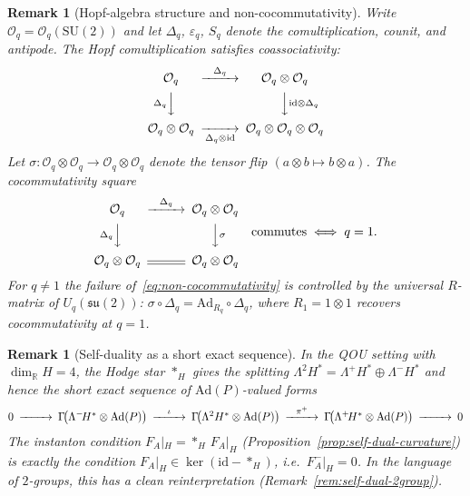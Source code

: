 \documentclass[12pt,a4paper]{report}
\newtheorem{remark}[theorem]{Remark}
\begin{document}
\begin{remark}[Hopf-algebra structure and non-cocommutativity]
\label{rem:hopf-structure-diagrams}
Write $\mathcal{O}_q = \mathcal{O}_q(\mathrm{SU}(2))$ and let
$\Delta_q$, $\varepsilon_q$, $S_q$ denote the comultiplication,
counit, and antipode.  The Hopf comultiplication satisfies
\emph{coassociativity}:
\begin{equation}\label{eq:coassociativity}
\begin{CD}
\mathcal{O}_q @>{\Delta_q}>>
  \mathcal{O}_q \otimes \mathcal{O}_q \\
@V{\Delta_q}VV
  @VV{\mathrm{id} \otimes \Delta_q}V \\
\mathcal{O}_q \otimes \mathcal{O}_q
  @>>{\Delta_q \otimes \mathrm{id}}>
  \mathcal{O}_q \otimes \mathcal{O}_q \otimes \mathcal{O}_q
\end{CD}
\end{equation}
Let $\sigma \colon \mathcal{O}_q \otimes \mathcal{O}_q \to
\mathcal{O}_q \otimes \mathcal{O}_q$ denote the tensor flip
$(a \otimes b \mapsto b \otimes a)$.  The cocommutativity square
\begin{equation}\label{eq:non-cocommutativity}
\begin{CD}
\mathcal{O}_q @>{\Delta_q}>>
  \mathcal{O}_q \otimes \mathcal{O}_q \\
@V{\Delta_q}VV  @VV{\sigma}V \\
\mathcal{O}_q \otimes \mathcal{O}_q
  @=
  \mathcal{O}_q \otimes \mathcal{O}_q
\end{CD}
\quad\text{commutes}\;\Longleftrightarrow\;q = 1.
\end{equation}
For $q \neq 1$ the failure of~\eqref{eq:non-cocommutativity} is
controlled by the universal $R$-matrix of $U_q(\mathfrak{su}(2))$:
$\sigma \circ \Delta_q = \mathrm{Ad}_{R_q} \circ \Delta_q$,
where $R_1 = 1 \otimes 1$ recovers cocommutativity at $q = 1$.
\end{remark}

\begin{remark}[Self-duality as a short exact sequence]
\label{rem:self-dual-ses}
In the QOU setting with $\dim_{\mathbb{R}} H = 4$, the Hodge star
$*_H$ gives the splitting
$\Lambda^2 H^* = \Lambda^+\!H^* \oplus \Lambda^-\!H^*$ and hence
the short exact sequence of $\mathrm{Ad}(P)$-valued forms
\begin{equation}\label{eq:self-dual-ses}
\begin{CD}
0 @>>>
  \Gamma\!\bigl(\Lambda^-\!H^* \otimes \mathrm{Ad}(P)\bigr)
  @>{\iota}>>
  \Gamma\!\bigl(\Lambda^2 H^* \otimes \mathrm{Ad}(P)\bigr)
  @>{\pi^+}>>
  \Gamma\!\bigl(\Lambda^+\!H^* \otimes \mathrm{Ad}(P)\bigr)
  @>>> 0
\end{CD}
\end{equation}
The instanton condition
$F_A|_H = {*_H}\,F_A|_H$
(Proposition~\ref{prop:self-dual-curvature}) is exactly the condition
$F_A|_H \in \ker(\mathrm{id} - {*_H})$,
i.e.\ $F_A^-|_H = 0$.  In the language of $2$-groups, this has a
clean reinterpretation
(Remark~\ref{rem:self-dual-2group}).
\end{remark}
\end{document}
